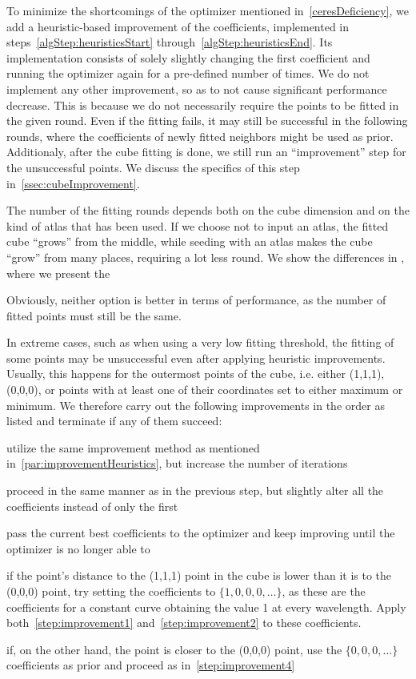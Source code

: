 To minimize the shortcomings of the optimizer mentioned in~\cref{ceresDeficiency}, we add a heuristic-based improvement of the coefficients, implemented in steps~\ref{algStep:heuristicsStart} through~\ref{algStep:heuristicsEnd}. Its implementation consists of solely slightly changing the first coefficient and running the optimizer again for a pre-defined number of times. We do not implement any other improvement, so as to not cause significant performance decrease. This is because we do not necessarily require the points to be fitted in the given round. Even if the fitting fails, it may still be successful in the following rounds, where the coefficients of newly fitted neighbors might be used as prior. Additionaly, after the cube fitting is done, we still run an ``improvement'' step for the unsuccessful points. We discuss the specifics of this step in~\cref{ssec:cubeImprovement}.

The number of the fitting rounds depends both on the cube dimension and on the kind of atlas that has been used. If we choose not to input an atlas, the fitted cube ``grows'' from the middle, while seeding with an atlas makes the cube ``grow'' from many places, requiring a lot less round. We show the differences in , where we present the 

Obviously, neither option is better in terms of performance, as the number of fitted points must still be the same.


In extreme cases, such as when using a very low fitting threshold, the fitting of some points may be unsuccessful even after applying heuristic improvements. Usually, this happens for the outermost points of the cube, i.e. either (1,1,1), (0,0,0), or points with at least one of their coordinates set to either maximum or minimum. We therefore carry out the following improvements in the order as listed and terminate if any of them succeed: 
\begin{steps}
	\item utilize the same improvement method as mentioned in~\cref{par:improvementHeuristics}, but increase the number of iterations \label{step:improvement1}
	\item proceed in the same manner as in the previous step, but slightly alter all the coefficients instead of only the first \label{step:improvement2}
	\item pass the current best coefficients to the optimizer and keep improving until the optimizer is no longer able to
	\item if the point's distance to the (1,1,1) point in the cube is lower than it is to the (0,0,0) point, try setting the coefficients to $\{1, 0, 0, 0, \ldots\}$, as these are the coefficients for a constant curve obtaining the value 1 at every wavelength. Apply both~\ref{step:improvement1} and~\ref{step:improvement2} to these coefficients.\label{step:improvement4}
	\item if, on the other hand, the point is closer to the (0,0,0) point, use the $\{0, 0, 0 ,\ldots\}$ coefficients as prior and proceed as in~\ref{step:improvement4}
\end{steps}

